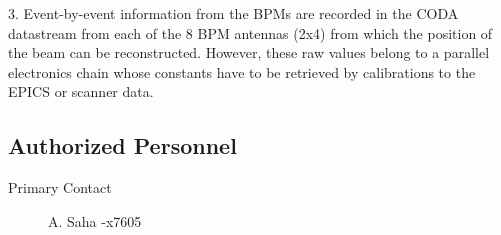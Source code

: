 3. Event-by-event information from the BPMs are recorded in the CODA datastream
from each of the 8 BPM antennas (2x4) from which the position of the beam can be 
reconstructed. However, these raw values belong to a parallel electronics chain 
whose constants have to be retrieved by calibrations to the EPICS or scanner 
data. 

\begin{safetyen}{10}{10}
\subsection{ Authorized Personnel}
\end{safetyen}

\begin{description}
\item[Primary Contact]A. Saha -x7605
\end{description}

%
%
%
%
